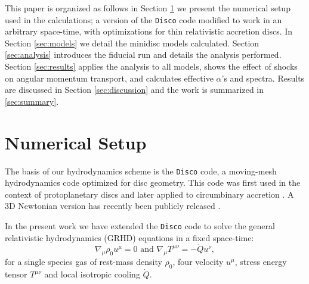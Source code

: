 \documentclass{emulateapj}
\newcommand{\Disco}{{\texttt{Disco}}}
\begin{document}
This paper is organized as follows in Section \ref{sec:numerics} we present the
numerical setup used in the calculations; a version of the \Disco{} code 
modified to work in an arbitrary space-time, with optimizations for thin 
relativistic accretion discs.  In Section \ref{sec:models} we detail the 
minidisc models calculated.  Section \ref{sec:analysis} introduces the fiducial run and details the analysis performed.  Section \ref{sec:results} applies the analysis to all models, shows the effect of shocks on angular momentum transport, and calculates effective $\alpha$'s and spectra. Results are discussed in Section \ref{sec:discussion} and the work is summarized in \ref{sec:summary}.


\section{Numerical Setup}
\label{sec:numerics}

The basis of our hydrodynamics scheme is the \Disco{} code, a moving-mesh hydrodynamics
code optimized for disc geometry. This code was first used in the context of
protoplanetary discs \citep{Duffell12, Duffell13, Duffell14} and later applied 
to circumbinary accretion \citep{Farris14, Farris15A, Farris15B}. A 3D Newtonian version has recently been publicly released \citep{Duffell16}.

In the present work we have extended the \Disco{} code to solve the general relativistic hydrodynamics (GRHD) equations in a fixed space-time:
\begin{equation}
    \nabla_\mu \rho_0 u^\mu = 0 \text{ and } \nabla_\mu T^{\mu\nu} = -\dot{Q} u^\nu , \label{eq:GRHD}
\end{equation}
for a single species gas of rest-mass density $\rho_0$, four velocity $u^\mu$, 
stress energy tensor $T^{\mu\nu}$ and local isotropic cooling $\dot{Q}$.  
\end{document}
